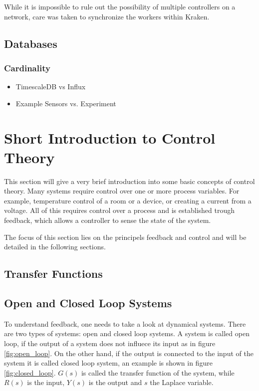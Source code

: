 While it is impossible to rule out the possibility of multiple controllers on a network, care was taken to synchronize the workers within Kraken.
\subsection{Databases}
\subsubsection{Cardinality}
\begin{itemize}
 \item TimescaleDB vs Influx
 \item Example Sensors vs. Experiment
\end{itemize}

\clearpage
\section{Short Introduction to Control Theory}
This section will give a very brief introduction into some basic concepts of control theory. Many systems require control over one or more process variables. For example, temperature control of a room or a device, or creating a current from a voltage. All of this requires control over a process and is established trough feedback, which allows a controller to sense the state of the system.

The focus of this section lies on the principels feedback and control and will be detailed in the following sections.

\subsection{Transfer Functions}

\subsection{Open and Closed Loop Systems}
To understand feedback, one needs to take a look at dynamical systems. There are two types of systems: open and closed loop systems. A system is called open loop, if the output of a system does not influece its input as in figure \ref{fig:open_loop}. On the other hand, if the output is connected to the input of the system it is called closed loop system, an example is shown in figure \ref{fig:closed_loop}. $G(s)$ is called the transfer function of the system, while $R(s)$ is the input, $Y(s)$ is the output and $s$ the Laplace variable.

